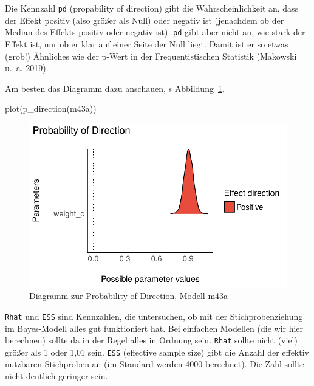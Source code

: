 \documentclass[
  a4paper,
  DIV=11]{scrreprt}
\newenvironment{Shaded}{\begin{snugshade}}{\end{snugshade}}
\newcommand{\FunctionTok}[1]{\textcolor[rgb]{0.28,0.35,0.67}{#1}}
\newcommand{\NormalTok}[1]{\textcolor[rgb]{0.00,0.23,0.31}{#1}}
\theoremstyle{definition}
\theoremstyle{remark}
\begin{document}
Die Kennzahl \texttt{pd} (propability of direction) gibt die
Wahrscheinlichkeit an, dass der Effekt positiv (also größer als Null)
oder negativ ist (jenachdem ob der Median des Effekts positiv oder
negativ ist). \texttt{pd} gibt aber nicht an, wie stark der Effekt ist,
nur ob er klar auf einer Seite der Null liegt. Damit ist er so etwas
(grob!) Ähnliches wie der p-Wert in der Frequentistischen Statistik
(Makowski u.~a. 2019).

Am besten das Diagramm dazu anschauen, s Abbildung~\ref{fig-pd1}.

\begin{Shaded}
\begin{Highlighting}[]
\FunctionTok{plot}\NormalTok{(}\FunctionTok{p\_direction}\NormalTok{(m43a))}
\end{Highlighting}
\end{Shaded}

\begin{figure}[H]

{\centering \includegraphics{./lineare-modelle_files/figure-pdf/fig-pd1-1.pdf}

}

\caption{\label{fig-pd1}Diagramm zur Probability of Direction, Modell
m43a}

\end{figure}

\texttt{Rhat} und \texttt{ESS} sind Kennzahlen, die untersuchen, ob mit
der Stichprobenziehung im Bayes-Modell alles gut funktioniert hat. Bei
einfachen Modellen (die wir hier berechnen) sollte da in der Regel alles
in Ordnung sein. \texttt{Rhat} sollte nicht (viel) größer als 1 oder
1,01 sein. \texttt{ESS} (effective sample size) gibt die Anzahl der
effektiv nutzbaren Stichproben an (im Standard werden 4000 berechnet).
Die Zahl sollte nicht deutlich geringer sein.
\end{document}
